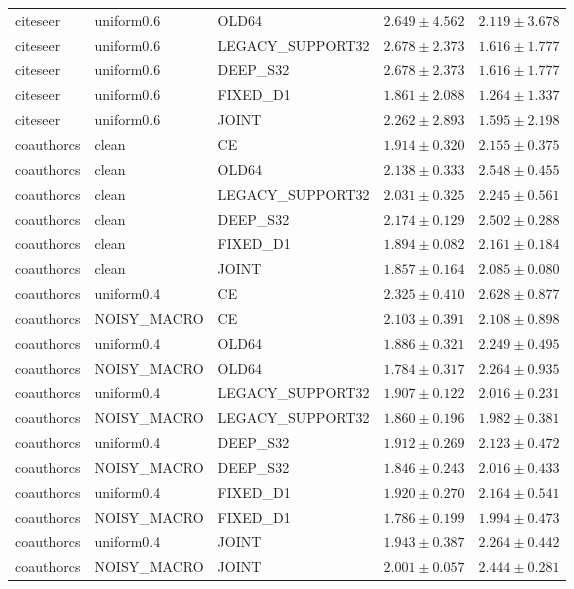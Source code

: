 \begin{longtable}{lllrr}
citeseer & uniform0.6 & OLD64 & $2.649 \pm 4.562$ & $2.119 \pm 3.678$ \\
citeseer & uniform0.6 & LEGACY\_SUPPORT32 & $2.678 \pm 2.373$ & $1.616 \pm 1.777$ \\
citeseer & uniform0.6 & DEEP\_S32 & $2.678 \pm 2.373$ & $1.616 \pm 1.777$ \\
citeseer & uniform0.6 & FIXED\_D1 & $1.861 \pm 2.088$ & $1.264 \pm 1.337$ \\
citeseer & uniform0.6 & JOINT & $2.262 \pm 2.893$ & $1.595 \pm 2.198$ \\
coauthorcs & clean & CE & $1.914 \pm 0.320$ & $2.155 \pm 0.375$ \\
coauthorcs & clean & OLD64 & $2.138 \pm 0.333$ & $2.548 \pm 0.455$ \\
coauthorcs & clean & LEGACY\_SUPPORT32 & $2.031 \pm 0.325$ & $2.245 \pm 0.561$ \\
coauthorcs & clean & DEEP\_S32 & $2.174 \pm 0.129$ & $2.502 \pm 0.288$ \\
coauthorcs & clean & FIXED\_D1 & $1.894 \pm 0.082$ & $2.161 \pm 0.184$ \\
coauthorcs & clean & JOINT & $1.857 \pm 0.164$ & $2.085 \pm 0.080$ \\
coauthorcs & uniform0.4 & CE & $2.325 \pm 0.410$ & $2.628 \pm 0.877$ \\
coauthorcs & NOISY\_MACRO & CE & $2.103 \pm 0.391$ & $2.108 \pm 0.898$ \\
coauthorcs & uniform0.4 & OLD64 & $1.886 \pm 0.321$ & $2.249 \pm 0.495$ \\
coauthorcs & NOISY\_MACRO & OLD64 & $1.784 \pm 0.317$ & $2.264 \pm 0.935$ \\
coauthorcs & uniform0.4 & LEGACY\_SUPPORT32 & $1.907 \pm 0.122$ & $2.016 \pm 0.231$ \\
coauthorcs & NOISY\_MACRO & LEGACY\_SUPPORT32 & $1.860 \pm 0.196$ & $1.982 \pm 0.381$ \\
coauthorcs & uniform0.4 & DEEP\_S32 & $1.912 \pm 0.269$ & $2.123 \pm 0.472$ \\
coauthorcs & NOISY\_MACRO & DEEP\_S32 & $1.846 \pm 0.243$ & $2.016 \pm 0.433$ \\
coauthorcs & uniform0.4 & FIXED\_D1 & $1.920 \pm 0.270$ & $2.164 \pm 0.541$ \\
coauthorcs & NOISY\_MACRO & FIXED\_D1 & $1.786 \pm 0.199$ & $1.994 \pm 0.473$ \\
coauthorcs & uniform0.4 & JOINT & $1.943 \pm 0.387$ & $2.264 \pm 0.442$ \\
coauthorcs & NOISY\_MACRO & JOINT & $2.001 \pm 0.057$ & $2.444 \pm 0.281$ \\

\end{longtable}

